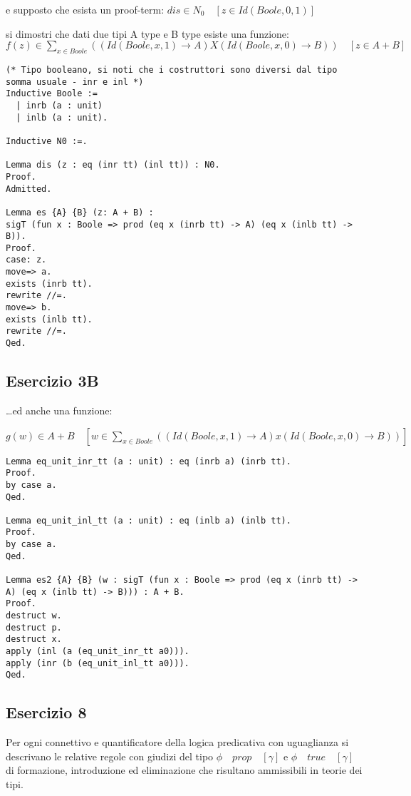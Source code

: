 e supposto che esista un proof-term:
$dis \in N_0 \quad [z \in Id(Boole, 0, 1)]$

si dimostri che dati due tipi A type e B type esiste una funzione:
$f(z) \in \sum_{x \in Boole} ( (Id(Boole, x, 1) \rightarrow A) X (Id(Boole, x, 0) \rightarrow B) ) \quad [ z \in A + B ]$

\begin{lstlisting}[language=Coq]
(* Tipo booleano, si noti che i costruttori sono diversi dal tipo somma usuale - inr e inl *)
Inductive Boole :=
  | inrb (a : unit)
  | inlb (a : unit).

Inductive N0 :=.

Lemma dis (z : eq (inr tt) (inl tt)) : N0.
Proof.
Admitted.

Lemma es {A} {B} (z: A + B) :
sigT (fun x : Boole => prod (eq x (inrb tt) -> A) (eq x (inlb tt) -> B)).
Proof.
case: z.
move=> a.
exists (inrb tt).
rewrite //=.
move=> b.
exists (inlb tt).
rewrite //=.
Qed.
\end{lstlisting}

\subsection{Esercizio 3B}

\dots ed anche una funzione:

$g(w) \in A + B \quad [w \in \sum_{x \in Boole} ( (Id(Boole, x, 1) \rightarrow A) x (Id(Boole, x, 0) \rightarrow B) )]$

\begin{lstlisting}[language=Coq]
Lemma eq_unit_inr_tt (a : unit) : eq (inrb a) (inrb tt).
Proof.
by case a.
Qed.

Lemma eq_unit_inl_tt (a : unit) : eq (inlb a) (inlb tt).
Proof.
by case a.
Qed.

Lemma es2 {A} {B} (w : sigT (fun x : Boole => prod (eq x (inrb tt) -> A) (eq x (inlb tt) -> B))) : A + B.
Proof.
destruct w.
destruct p.
destruct x.
apply (inl (a (eq_unit_inr_tt a0))).
apply (inr (b (eq_unit_inl_tt a0))).
Qed.
\end{lstlisting}

\subsection{Esercizio 8}

Per ogni connettivo e quantificatore della logica predicativa con uguaglianza si
descrivano le relative regole con giudizi del tipo $\phi \quad prop \quad [\gamma]$ e
$\phi \quad true \quad [\gamma]$ di formazione, introduzione ed eliminazione che risultano
ammissibili in teorie dei tipi.

